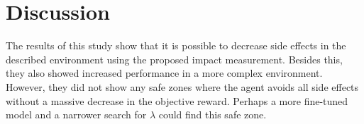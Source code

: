 \documentclass[12pt,A4]{report}
\theoremstyle{definition}
\begin{document}





\chapter{Discussion}
The results of this study show that it is possible to decrease side effects in the described environment using the proposed impact measurement. Besides this, they also showed increased performance in a more complex environment. However, they did not show any safe zones where the agent avoids all side effects without a massive decrease in the objective reward. Perhaps a more fine-tuned model and a narrower search for $\lambda$ could find this safe zone.
\end{document}
